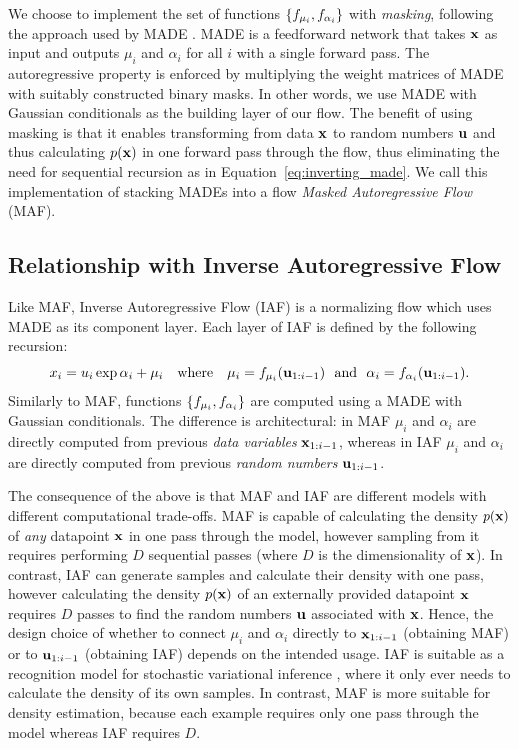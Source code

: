 We choose to implement the set of functions $\left\{f_{\mu_i}, f_{\alpha_i}\right\}$ with \emph{masking}, following the approach used by MADE \citep{Germain:2015}. MADE is a feedforward network that takes $\mathbf{x}$ as input and outputs $\mu_i$ and $\alpha_i$ for all $i$ with a single forward pass. The autoregressive property is enforced by multiplying the weight matrices of MADE with suitably constructed binary masks. In other words, we use MADE with Gaussian conditionals as the building layer of our flow. The benefit of using masking is that it enables transforming from data $\mathbf{x}$ to random numbers $\mathbf{u}$ and thus calculating $p\mathopen{}\left(\mathbf{x}\right)\mathclose{}$ in one forward pass through the flow, thus eliminating the need for sequential recursion as in Equation~\eqref{eq:inverting_made}. We call this implementation of stacking MADEs into a flow \emph{Masked Autoregressive Flow} (MAF)\@.

\subsection{Relationship with Inverse Autoregressive Flow}

Like MAF, Inverse Autoregressive Flow (IAF) \citep{Kingma:2016} is a normalizing flow which uses MADE as its component layer. Each layer of IAF is defined by the following recursion:
\begin{equation}
\label{eq:iaf}
x_i = u_i\exp{\alpha_i} + \mu_i
\quad\text{where}\quad
\mu_i = f_{\mu_i}\mathopen{}\left(\mathbf{u}_{1:i-1}\right)\mathclose{}
\,\,\,\,\text{and}\,\,\,\,
\alpha_i = f_{\alpha_i}\mathopen{}\left(\mathbf{u}_{1:i-1}\right)\mathclose{}.
\end{equation}
Similarly to MAF, functions $\left\{f_{\mu_i}, f_{\alpha_i}\right\}$ are computed using a MADE with Gaussian conditionals. The difference is architectural: in MAF $\mu_i$ and $\alpha_i$ are directly computed from previous \emph{data variables} $\mathbf{x}_{1:i-1}$, whereas in IAF $\mu_i$ and $\alpha_i$ are directly computed from previous \emph{random numbers} $\mathbf{u}_{1:i-1}$.

The consequence of the above is that MAF and IAF are different models with different computational trade-offs. MAF is capable of calculating the density $p\mathopen{}\left(\mathbf{x}\right)\mathclose{}$ of \emph{any} datapoint $\mathbf{x}$ in one pass through the model, however sampling from it requires performing $D$ sequential passes (where $D$ is the dimensionality of $\mathbf{x}$). In contrast, IAF can generate samples and calculate their density with one pass, however calculating the density $p\mathopen{}\left(\mathbf{x}\right)\mathclose{}$ of an externally provided datapoint $\mathbf{x}$ requires $D$ passes to find the random numbers $\mathbf{u}$ associated with $\mathbf{x}$. Hence, the design choice of whether to connect $\mu_i$ and $\alpha_i$ directly to $\mathbf{x}_{1:i-1}$ (obtaining MAF) or to $\mathbf{u}_{1:i-1}$ (obtaining IAF) depends on the intended usage. IAF is suitable as a recognition model for stochastic variational inference \citep{Kingma:2014, Rezende:2014}, where it only ever needs to calculate the density of its own samples. In contrast, MAF is more suitable for density estimation, because each example requires only one pass through the model whereas IAF requires $D$.

